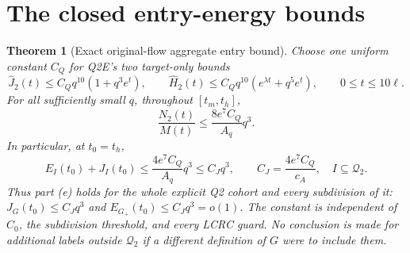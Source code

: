 \documentclass[11pt]{article}
\newtheorem{theorem}{Theorem}[section]
\theoremstyle{remark}\newtheorem{remark}[theorem]{Remark}
\newcommand{\Qtwo}{\mathcal Q_2}
\begin{document}
\section{The closed entry-energy bounds}
\begin{theorem}[Exact original-flow aggregate entry bound]
\label{an02q2epv1:energy}
Choose one uniform constant $C_Q$ for Q2E's two target-only bounds
\[
 \widehat J_2(t)\le C_Qq^{10}(1+q^3e^t),\qquad
 \widehat H_2(t)\le C_Qq^{10}(e^{\lambda t}+q^5e^t),
 \qquad 0\le t\le10\ell .
\]
For all sufficiently small $q$, throughout $[t_m,t_h]$,
\begin{equation}
 \frac{N_2(t)}{M(t)}
 \le \frac{8e^7C_Q}{A_q}q^3 .
 \label{an02q2epv1:massratio}
\end{equation}
In particular, at $t_0=t_h$,
\begin{equation}
 E_I(t_0)+J_I(t_0)\le
 \frac{4e^7C_Q}{A_q}q^3
 \le C_Jq^3,\qquad C_J=\frac{4e^7C_Q}{c_A},
 \quad I\subseteq\Qtwo .
 \label{an02q2epv1:entryenergy}
\end{equation}
Thus part (e) holds for the whole explicit Q2 cohort and every
subdivision of it: $J_G(t_0)\le C_Jq^3$ and
$E_{G_+}(t_0)\le C_Jq^3=o(1)$.
The constant is independent of $C_0$, the subdivision threshold,
and every LCRC guard.
No conclusion is made for additional labels outside $\Qtwo$ if
a different definition of $G$ were to include them.
\end{theorem}
\end{document}
